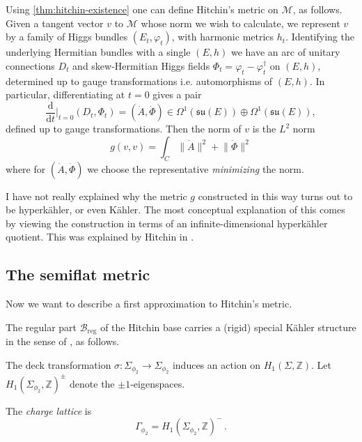 \documentclass[12pt,letterpaper,reqno]{article}
\numberwithin{equation}{section}
\begin{document}
Using \autoref{thm:hitchin-existence}
one can define Hitchin's metric on $\mathcal M$, as follows.
Given a tangent vector $v$ to $\mathcal M$ whose norm we wish to calculate, we represent $v$ by a family of Higgs bundles
$(E_t,\varphi_t)$, with harmonic metrics $h_t$.
Identifying the underlying Hermitian bundles with a single $(E,h)$
we have an arc of unitary connections $D_t$ and skew-Hermitian 
Higgs fields $\Phi_t = \varphi_t - \varphi_t^\dagger$ 
on $(E,h)$, determined up to gauge transformations i.e. 
automorphisms of $(E,h)$.
In particular, differentiating at $t = 0$ gives a pair
\begin{equation}
\frac{\mathrm{d}}{\mathrm{d} t}\Bigg\rvert_{t=0} (D_t, \Phi_t) = 
(\dot A, \dot \Phi) \in \Omega^1(\mathfrak{su}(E)) \oplus \Omega^{1}(\mathfrak{su}(E)),
\end{equation}
defined up to gauge transformations.
Then the norm of $v$ is the $L^2$ norm
\begin{equation} \label{eq:l2-metric-def}
  g(v,v) = \int_C \lVert \dot A \rVert^2 + \lVert \dot \Phi \rVert^2
\end{equation}
where for $(\dot A, \dot \Phi)$ we choose the representative
\textit{minimizing} the norm.

\begin{remark} I have not really explained
why the metric $g$ constructed in this way turns out to 
be hyperk\"ahler, or even K\"ahler. The most conceptual explanation
of this comes by viewing the construction in terms of 
an infinite-dimensional hyperk\"ahler quotient.
This was explained by
Hitchin in \cite{MR89a:32021}.

\end{remark}

\subsection{The semiflat metric}

Now we want to describe a first approximation to Hitchin's metric.

The regular part $\mathcal B_\mathrm{reg}$ of the Hitchin base 
carries a (rigid) special K\"ahler structure 
in the sense of \cite{Freed:1997dp}, as follows.

The deck transformation $\sigma: \Sigma_{\phi_2} \to \Sigma_{\phi_2}$
induces an action on $H_1(\Sigma, \mathbb Z)$.
Let $H_1(\Sigma_{\phi_2}, \mathbb Z)^\pm$ denote the $\pm 1$-eigenspaces.

\begin{defn}
The \textit{charge lattice} is
\begin{equation}
    \Gamma_{\phi_2} = H_1(\Sigma_{\phi_2}, \mathbb Z)^- \, .
\end{equation}
\end{defn}
\end{document}
